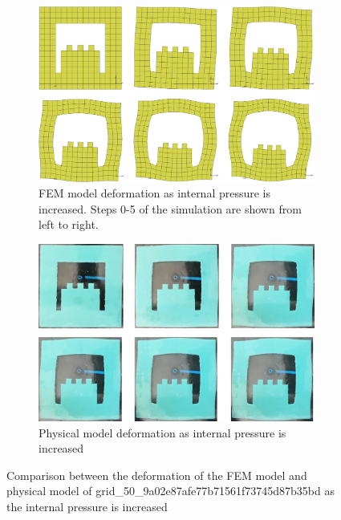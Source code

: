 \begin{figure}[H]
	\centering
	\begin{subfigure}[c]{\textwidth}
		\centering
		\includegraphics[width=\textwidth]{unit3deffem.png}
		\caption{FEM model deformation as internal pressure is increased. Steps 0-5 of the simulation are shown from left to right.}
	\end{subfigure}
	\hfill
	\begin{subfigure}[c]{\textwidth}
		\centering
		\includegraphics[width=\textwidth]{unit3defmod.png}
		\caption{Physical model deformation as internal pressure is increased}
	\end{subfigure}
	\caption[Comparison between FEM and physical models of unit 3]{Comparison between the deformation of the FEM model and physical model of grid\_50\_9a02e87afe77b71561f73745d87b35bd as the internal pressure is increased}
	\label{fig:unit3def}
\end{figure}

